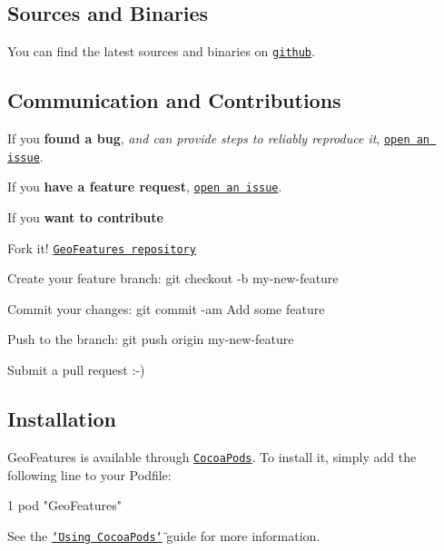 \subsection*{Sources and Binaries}

You can find the latest sources and binaries on \href{https://github.com/tonystone/geofeatures}{\tt github}.

\subsection*{Communication and Contributions}


\begin{DoxyItemize}
\item If you {\bfseries found a bug}, {\itshape and can provide steps to reliably reproduce it}, \href{https://github.com/tonystone/geofeatures/issues}{\tt open an issue}.
\item If you {\bfseries have a feature request}, \href{https://github.com/tonystone/geofeatures/issues}{\tt open an issue}.
\item If you {\bfseries want to contribute}
\begin{DoxyItemize}
\item Fork it! \href{https://github.com/tonystone/geofeatures}{\tt Geo\+Features repository}
\item Create your feature branch\+: {\ttfamily git checkout -\/b my-\/new-\/feature}
\item Commit your changes\+: {\ttfamily git commit -\/am \textquotesingle{}Add some feature\textquotesingle{}}
\item Push to the branch\+: {\ttfamily git push origin my-\/new-\/feature}
\item Submit a pull request \+:-\/)
\end{DoxyItemize}
\end{DoxyItemize}

\subsection*{Installation}

Geo\+Features is available through \href{http://cocoapods.org}{\tt Cocoa\+Pods}. To install it, simply add the following line to your Podfile\+:


\begin{DoxyCode}
1 pod "GeoFeatures"
\end{DoxyCode}


See the \href{https://guides.cocoapods.org/using/using-cocoapods.html}{\tt \char`\"{}\+Using Cocoa\+Pods\char`\"{}} guide for more information.

